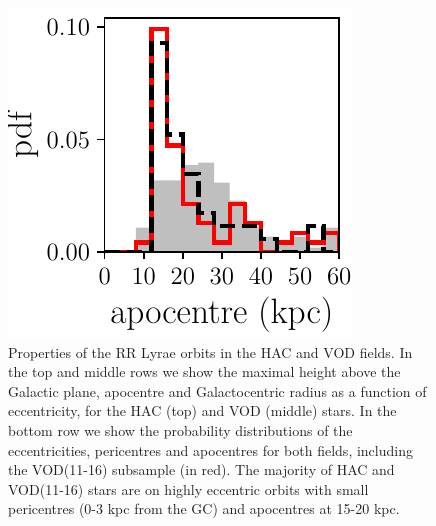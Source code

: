 \documentclass[fleqn,usenatbib]{mnras}
\begin{document}
\begin{figure}
                          \includegraphics[scale=0.473]{apocentres.pdf} 
\vspace{-0.45cm}
  \caption{Properties of the RR Lyrae orbits in the HAC and VOD
    fields. In the top and middle rows we show the maximal height
    above the Galactic plane, apocentre and Galactocentric radius as a
    function of eccentricity, for the HAC (top) and VOD (middle)
    stars. In the bottom row we show the probability distributions of
    the eccentricities, pericentres and apocentres for both fields,
    including the VOD(11-16) subsample (in red). The majority of HAC
    and VOD(11-16) stars are on highly eccentric orbits with small
    pericentres (0-3 kpc from the GC) and apocentres at 15-20 kpc.}
    \label{fig:orbits}   
    \end{figure}
%
\end{document}
